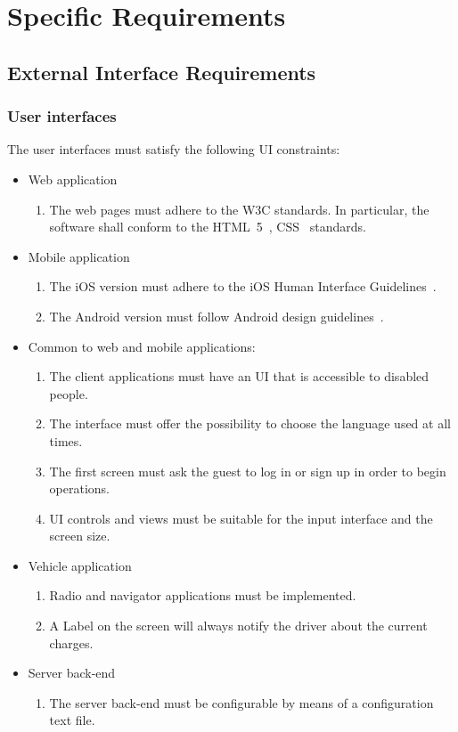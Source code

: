 \section{Specific Requirements}\label{sec requirements}

\subsection{External Interface Requirements}

\subsubsection{User interfaces}

The user interfaces must satisfy the following UI constraints:
\begin{itemize}
	\item Web application
	\begin{enumerate}
		\item The web pages must adhere to the W3C standards. In particular, the software shall conform to the HTML~5~\cite{w3c-html5}, CSS~\cite{w3c-css} standards.
	\end{enumerate}
	\item Mobile application
	\begin{enumerate}
		\item The iOS version must adhere to the iOS Human Interface Guidelines~\cite{apple-ios-hig}.
		\item The Android version must follow Android design guidelines~\cite{google-android-hig}.
	\end{enumerate}
		\item Common to web and mobile applications:
		\begin{enumerate}
			\item The client applications must have an UI that is accessible to disabled people.
			\item The interface must offer the possibility to choose the language used at all times.
			\item The first screen must ask the guest to log in or sign up in order to begin operations.
			\item UI controls and views must be suitable for the input interface and the screen size.
		\end{enumerate}
	\item Vehicle application
	\begin{enumerate}
		\item Radio and navigator applications must be implemented.
		\item A Label on the screen will always notify the driver about the current charges.
	\end{enumerate}
	\item Server back-end
	\begin{enumerate}
		\item The server back-end must be configurable by means of a configuration text file.
	\end{enumerate}
	

\end{itemize}
